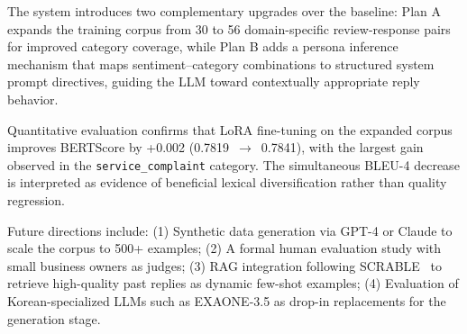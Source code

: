 \documentclass[conference]{IEEEtran}
\begin{document}
The system introduces two complementary upgrades over the baseline:
Plan A expands the training corpus from 30 to 56 domain-specific
review-response pairs for improved category coverage, while Plan B
adds a persona inference mechanism that maps sentiment--category
combinations to structured system prompt directives, guiding the LLM
toward contextually appropriate reply behavior.

Quantitative evaluation confirms that LoRA fine-tuning on the expanded
corpus improves BERTScore by +0.002 (0.7819~$\rightarrow$~0.7841),
with the largest gain observed in the \texttt{service\_complaint}
category.
The simultaneous BLEU-4 decrease is interpreted as evidence of
beneficial lexical diversification rather than quality regression.

Future directions include:
(1) Synthetic data generation via GPT-4 or Claude to scale the corpus
to 500+ examples;
(2) A formal human evaluation study with small business owners as
judges;
(3) RAG integration following SCRABLE~\cite{scrable2024} to retrieve
high-quality past replies as dynamic few-shot examples;
(4) Evaluation of Korean-specialized LLMs such as EXAONE-3.5 as
drop-in replacements for the generation stage.
\end{document}

